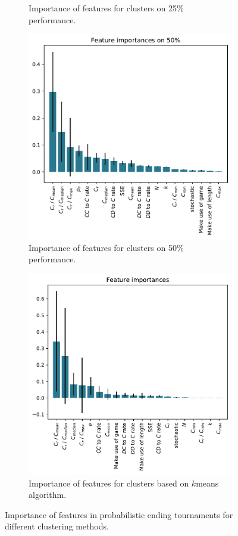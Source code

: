 \documentclass{article}
\begin{document}
\begin{figure}[!htbp]
\begin{subfigure}[t]{0.5\textwidth}
\begin{center}
        \end{center}
        \caption{Importance of features for clusters on 25\% performance.}
    \end{subfigure}
    \begin{subfigure}[t]{0.5\textwidth}
        \begin{center}
            \includegraphics[width=.75\linewidth]{../new_output/probend/_feature_importance_bar_plot_cluster_on_0_5.pdf}
        \end{center}
        \caption{Importance of features for clusters on 50\% performance.}
    \end{subfigure}
    \begin{subfigure}[t]{0.5\textwidth}
        \begin{center}
            \includegraphics[width=.75\linewidth]{../k_means_output/probend/_feature_importance_bar_plot.pdf}
        \end{center}
        \caption{Importance of features for clusters based on \(k\)means algorithm.}
    \end{subfigure}
    \caption{Importance of features in probabilistic ending tournaments for different
    clustering methods.}\label{fig:clustering_importance_probend}
\end{figure}
\end{document}
